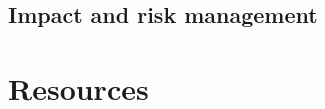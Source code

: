 \documentclass[11pt,a4paper]{article}
\begin{document}

\label{sec:ProjectPlanning}



\subsection{Impact and risk management}


\label{sec:ImpactAndRisk}




\section{Resources}
\end{document}
